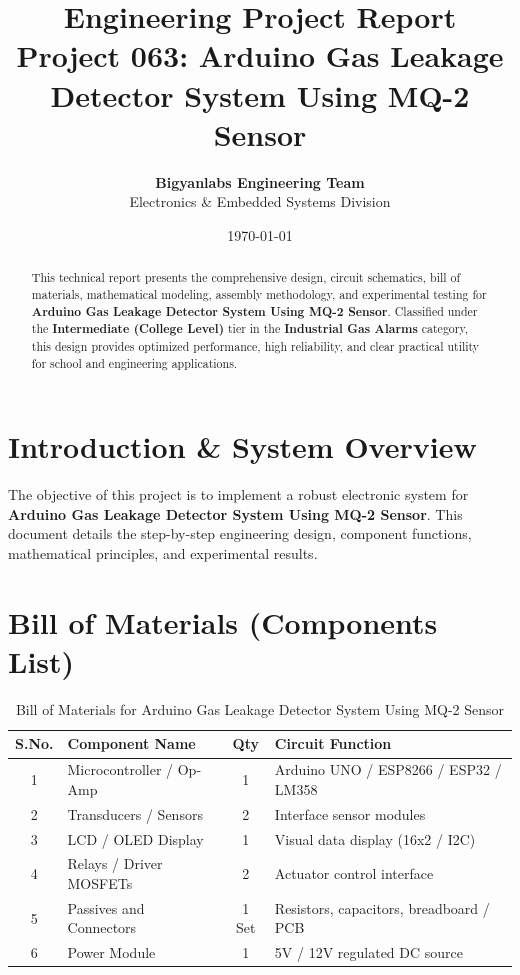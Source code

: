 \documentclass[11pt,a4paper]{article}
\title{\textbf{\Huge Engineering Project Report}\\[0.5em] \Large Project 063: Arduino Gas Leakage Detector System Using MQ-2 Sensor}
\author{\textbf{Bigyanlabs Engineering Team}\\ Electronics \& Embedded Systems Division}
\date{\today}
\begin{document}
\maketitle
\thispagestyle{empty}

\begin{abstract}
This technical report presents the comprehensive design, circuit schematics, bill of materials, mathematical modeling, assembly methodology, and experimental testing for \textbf{Arduino Gas Leakage Detector System Using MQ-2 Sensor}. Classified under the \textbf{Intermediate (College Level)} tier in the \textbf{Industrial Gas Alarms} category, this design provides optimized performance, high reliability, and clear practical utility for school and engineering applications.
\end{abstract}

\newpage
\tableofcontents
\newpage

\section{Introduction \& System Overview}
The objective of this project is to implement a robust electronic system for \textbf{Arduino Gas Leakage Detector System Using MQ-2 Sensor}. This document details the step-by-step engineering design, component functions, mathematical principles, and experimental results.

\section{Bill of Materials (Components List)}
\begin{table}[h!]
\centering
\caption{Bill of Materials for Arduino Gas Leakage Detector System Using MQ-2 Sensor}
\vspace{0.5em}
\begin{tabular}{clcp{7cm}}
\toprule
\textbf{S.No.} & \textbf{Component Name} & \textbf{Qty} & \textbf{Circuit Function} \\
\midrule
1 & Microcontroller / Op-Amp & 1 & Arduino UNO / ESP8266 / ESP32 / LM358 \\
2 & Transducers / Sensors & 2 & Interface sensor modules \\
3 & LCD / OLED Display & 1 & Visual data display (16x2 / I2C) \\
4 & Relays / Driver MOSFETs & 2 & Actuator control interface \\
5 & Passives and Connectors & 1 Set & Resistors, capacitors, breadboard / PCB \\
6 & Power Module & 1 & 5V / 12V regulated DC source \\
\bottomrule
\end{tabular}
\end{table}
\end{document}
